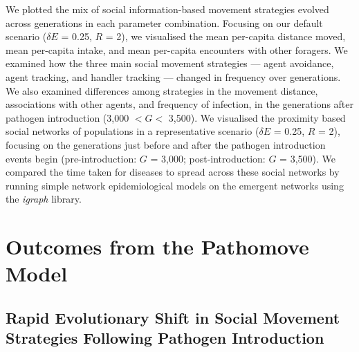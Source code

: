 We plotted the mix of social information-based movement strategies evolved across generations in each parameter combination.
Focusing on our default scenario ($\delta E$ = 0.25, $R$ = 2), we visualised the mean per-capita distance moved, mean per-capita intake, and mean per-capita encounters with other foragers.
We examined how the three main social movement strategies --- agent avoidance, agent tracking, and handler tracking --- changed in frequency over generations.
We also examined differences among strategies in the movement distance, associations with other agents, and frequency of infection, in the generations after pathogen introduction (3,000 $< G <$ 3,500).
We visualised the proximity based social networks of populations in a representative scenario ($\delta E$ = 0.25, $R$ = 2), focusing on the generations just before and after the pathogen introduction events begin (pre-introduction: $G$ = 3,000; post-introduction: $G$ = 3,500).
We compared the time taken for diseases to spread across these social networks by running simple network epidemiological models on the emergent networks \citep{bailey1975,white2017,stroeymeyt2018} using the \textit{igraph} \citep{csardi2006} library.

\section*{Outcomes from the Pathomove Model}

\subsection*{Rapid Evolutionary Shift in Social Movement Strategies Following Pathogen Introduction}


